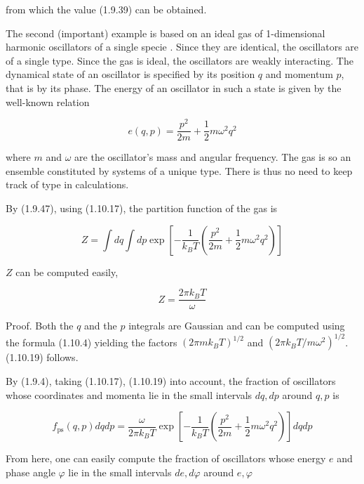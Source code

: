 \documentclass{article}
\begin{document}
from which the value (1.9.39) can be obtained.

The second (important) example is based on an ideal gas of 1-dimensional harmonic oscillators of a single specie . Since they are identical, the oscillators are of a single type. Since the gas is ideal, the oscillators are weakly interacting. The dynamical state of an oscillator is specified by its position $q$ and momentum $p$, that is by its phase. The energy of an oscillator in such a state is given by the well-known relation
 
\begin{equation*}
e(q, p)=\frac{p^{2}}{2 m}+\frac{1}{2} m \omega^{2} q^{2} \tag{1.10.17}
\end{equation*}
 
where $m$ and $\omega$ are the oscillator's mass and angular frequency. The gas is so an ensemble constituted by systems of a unique type. There is thus no need to keep track of type in calculations.

By (1.9.47), using (1.10.17), the partition function of the gas is
 
\begin{equation*}
Z=\int d q \int d p \exp \left[-\frac{1}{k_{B} T}\left(\frac{p^{2}}{2 m}+\frac{1}{2} m \omega^{2} q^{2}\right)\right] \tag{1.10.18}
\end{equation*}
 
$Z$ can be computed easily,
 
\begin{equation*}
Z=\frac{2 \pi k_{B} T}{\omega} \tag{1.10.19}
\end{equation*}
 

Proof. Both the $q$ and the $p$ integrals are Gaussian and can be computed using the formula (1.10.4) yielding the factors $\left(2 \pi m k_{B} T\right)^{1 / 2}$ and $\left(2 \pi k_{B} T / m \omega^{2}\right)^{1 / 2}$. (1.10.19) follows.

By (1.9.4), taking (1.10.17), (1.10.19) into account, the fraction of oscillators whose coordinates and momenta lie in the small intervals $d q, d p$ around $q, p$ is
 
\begin{equation*}
f_{\mathrm{ps}}(q, p) d q d p=\frac{\omega}{2 \pi k_{B} T} \exp \left[-\frac{1}{k_{B} T}\left(\frac{p^{2}}{2 m}+\frac{1}{2} m \omega^{2} q^{2}\right)\right] d q d p \tag{1.10.20}
\end{equation*}
 

From here, one can easily compute the fraction of oscillators whose energy $e$ and phase angle $\varphi$ lie in the small intervals $d e, d \varphi$ around $e, \varphi$
 
\end{document}
